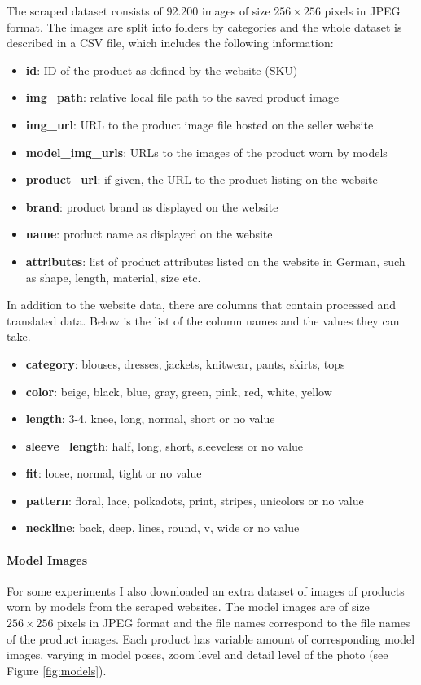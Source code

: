 \documentclass[12pt]{report}
\begin{document}
The scraped dataset consists of 92.200 images of size $256\times256$ pixels in JPEG format. The images are split into folders by categories and the whole dataset is described in a CSV file, which includes the following information:
\begin{itemize}
\item \textbf{id}: ID of the product as defined by the website (SKU)
\item \textbf{img\_path}: relative local file path to the saved product image
\item \textbf{img\_url}: URL to the product image file hosted on the seller website
\item \textbf{model\_img\_urls}: URLs to the images of the product worn by models
\item \textbf{product\_url}: if given, the URL to the product listing on the website
\item \textbf{brand}: product brand as displayed on the website
\item \textbf{name}: product name as displayed on the website
\item \textbf{attributes}: list of product attributes listed on the website in German, such as shape, length, material, size etc.
\end{itemize}

In addition to the website data, there are columns that contain processed and translated data. Below is the list of the column names and the values they can take.
\begin{itemize}
\item \textbf{category}: blouses, dresses, jackets, knitwear, pants, skirts, tops
\item \textbf{color}: beige, black, blue, gray, green, pink, red, white, yellow
\item \textbf{length}: 3-4, knee, long, normal, short or no value
\item \textbf{sleeve\_length}: half, long, short, sleeveless or no value
\item \textbf{fit}: loose, normal, tight or no value
\item \textbf{pattern}: floral, lace, polkadots, print, stripes, unicolors or no value
\item \textbf{neckline}: back, deep, lines, round, v, wide or no value
\end{itemize}

\paragraph{Model Images}
For some experiments I also downloaded an extra dataset of images of products worn by models from the scraped websites. The model images are of size $256\times256$ pixels in JPEG format and the file names correspond to the file names of the product images. Each product has variable amount of corresponding model images, varying in model poses, zoom level and detail level of the photo (see Figure \ref{fig:models}).
\end{document}
